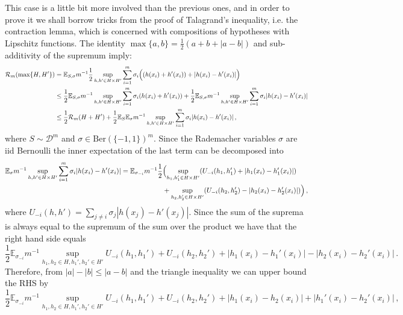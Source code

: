 \documentclass[a4paper]{article}
\newcommand{\ex}{\mathbb{E}}
\begin{document}
This case is a little bit more involved than the previous ones, and in order to
prove it we shall borrow tricks from the proof of Talagrand's inequality, i.e. the
contraction lemma, which is concerned with compositions of hypotheses with Lipschitz
functions. The identity $\max\{a, b\} = \frac{1}{2}(a+b+|a-b|)$ and sub-additivity
of the supremum imply:
\begin{align*}
  \mathcal{R}_m(\max\{H,H'\})
    &= \ex_{S, \sigma} m^{-1} \frac{1}{2} \sup_{h, h'\in H\times H'}
            \sum_{i=1}^m \sigma_i \Bigl((h(x_i) + h'(x_i)) + |h(x_i) - h'(x_i)|\Bigr)\\
    &\leq \frac{1}{2} \ex_{S, \sigma}
            m^{-1} \sup_{h, h'\in H\times H'} \sum_{i=1}^m \sigma_i (h(x_i) + h'(x_i))
          + \frac{1}{2} \ex_{S, \sigma}
            m^{-1} \sup_{h, h'\in H\times H'} \sum_{i=1}^m \sigma_i |h(x_i) - h'(x_i)| \\
    &\leq \frac{1}{2} \mathcal{R}_m(H+H')
          + \frac{1}{2} \ex_S \ex_\sigma
            m^{-1} \sup_{h, h'\in H\times H'} \sum_{i=1}^m \sigma_i |h(x_i) - h'(x_i)| \,,
\end{align*}
where $S \sim \mathcal{D}^m$ and $\sigma\in \text{Ber}(\{-1, 1\})^m$. Since the
Rademacher variables $\sigma$ are iid Bernoulli the inner expectation of the last
term can be decomposed into
\begin{align*}
  \ex_\sigma m^{-1} \sup_{h, h'\in H\times H'}
      \sum_{i=1}^m \sigma_i |h(x_i) - h'(x_i)|
    = \ex_{\sigma_{-i}} m^{-1} \frac{1}{2} &\Bigl(
      \sup_{h_1, h_1'\in H\times H'}
        (U_{-i}(h_1,h_1') + |h_1(x_i) - h_1'(x_i)|) \\
      &+ \sup_{h_2, h_2'\in H\times H'}
        (U_{-i}(h_2,h_2') - |h_2(x_i) - h_2'(x_i)|) \Bigr) \,,
\end{align*}
where $U_{-i}(h,h') = \sum_{j\neq i} \sigma_j |h(x_j) - h'(x_j)|$. Since the sum
of the suprema is always equal to the supremum of the sum over the product we have
that the right hand side equals
\begin{equation*}
  \frac{1}{2} \ex_{\sigma_{-i}} m^{-1}
      \sup_{h_1, h_2\in H, h_1', h_2'\in H'}
        U_{-i}(h_1,h_1') + U_{-i}(h_2,h_2')
        + |h_1(x_i) - h_1'(x_i)| - |h_2(x_i) - h_2'(x_i)| \,.
\end{equation*}
Therefore, from $|a|-|b|\leq |a-b|$ and the triangle inequality we can upper bound
the RHS by
\begin{equation*}
  \frac{1}{2} \ex_{\sigma_{-i}} m^{-1}
      \sup_{h_1, h_2\in H, h_1', h_2'\in H'}
        U_{-i}(h_1,h_1') + U_{-i}(h_2,h_2')
        + |h_1(x_i) - h_2(x_i)| + |h_1'(x_i) - h_2'(x_i)| \,,
\end{equation*}
\end{document}
